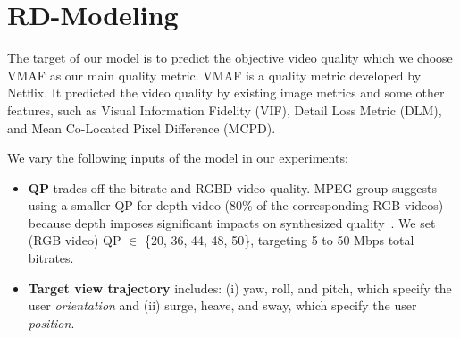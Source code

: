 \section{RD-Modeling} \label{sec:modeling}

The target of our model is to predict the objective video quality which we choose VMAF as our main quality metric.
VMAF is a quality metric developed by Netflix.
It predicted the video quality by existing image metrics and some other features, such as Visual Information Fidelity (VIF), Detail Loss Metric (DLM), and Mean Co-Located Pixel Difference (MCPD).

We vary the following inputs of the model in our experiments:
\begin{itemize}
\item {\bf QP} trades off the bitrate and RGBD video quality.
MPEG group suggests using a smaller QP for depth video (80\% of the corresponding RGB videos) because depth imposes significant impacts on synthesized quality~\cite{jung2020common}.
We set (RGB video) QP $\in$ \{20, 36, 44, 48, 50\}, targeting 5 to 50 Mbps total bitrates.
\item {\bf Target view trajectory} includes: (i) yaw, roll, and pitch, which specify the user {\em orientation} and (ii) surge, heave, and sway, which specify the user {\em position}.
\end{itemize}